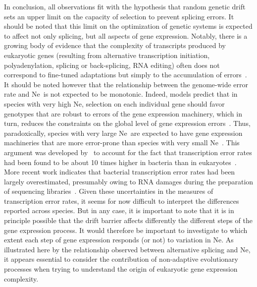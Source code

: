 In conclusion, all observations fit with the hypothesis that random genetic drift sets an upper limit on the capacity of selection to prevent splicing errors. It should be noted that this limit on the optimization of genetic systems is expected to affect not only splicing, but all aspects of gene expression. Notably, there is a growing body of evidence that the complexity of transcripts produced by eukaryotic genes (resulting from alternative transcription initiation, polyadenylation, splicing or back-splicing, RNA editing) often does not correspond to fine-tuned adaptations but simply to the accumulation of errors~\citep{pickrell_noisy_2010, saudemont_fitness_2017, xu_evidence_2019, xu_alternative_2018, liu_most_2018, liu_human_2018, xu_human_2014, xu_different_2020, gout_large-scale_2013, zhang_gene_2022}. It should be noted however that the relationship between the genome-wide error rate and \acrshort{Ne}~is not expected to be monotonic. Indeed, models predict that in species with very high \acrshort{Ne}, selection on each individual gene should favor genotypes that are robust to errors of the gene expression machinery, which in turn, reduces the constraints on the global level of gene expression errors~\citep{rajon_evolution_2011,xiong_drift_2017}. Thus, paradoxically, species with very large \acrshort{Ne}~are expected to have gene expression machineries that are more error-prone than species with very small \acrshort{Ne}~\citep{rajon_evolution_2011}. This argument was developed by~\citet{xiong_drift_2017} to account for the fact that transcription error rates had been found to be about 10 times higher in bacteria than in eukaryotes~\citep{traverse_cover_2016,gout_large-scale_2013}. More recent work indicates that bacterial transcription error rates had been largely overestimated, presumably owing to RNA damages during the preparation of sequencing libraries~\citep{li_universally_2020}. Given these uncertainties in the measures of transcription error rates, it seems for now difficult to interpret the differences reported across species. But in any case, it is important to note that it is in principle possible that the drift barrier affects differently the different steps of the gene expression process. It would therefore be important to investigate to which extent each step of gene expression responds (or not) to variation in \acrshort{Ne}. As illustrated here by the relationship observed between alternative splicing and \acrshort{Ne}, it appears essential to consider the contribution of non-adaptive evolutionary processes when trying to understand the origin of eukaryotic gene expression complexity.

